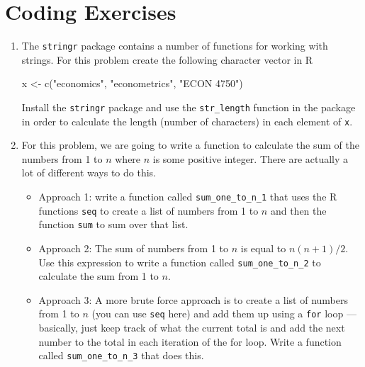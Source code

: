 \documentclass[
  letterpaper,
  DIV=11,
  numbers=noendperiod]{scrreprt}
\newenvironment{Shaded}{\begin{snugshade}}{\end{snugshade}}
\newcommand{\FunctionTok}[1]{\textcolor[rgb]{0.28,0.35,0.67}{#1}}
\newcommand{\NormalTok}[1]{\textcolor[rgb]{0.00,0.23,0.31}{#1}}
\newcommand{\OtherTok}[1]{\textcolor[rgb]{0.00,0.23,0.31}{#1}}
\newcommand{\StringTok}[1]{\textcolor[rgb]{0.13,0.47,0.30}{#1}}
\begin{document}
\section{Coding Exercises}\label{coding-exercises}

\begin{enumerate}
\def\labelenumi{\arabic{enumi}.}
\item
  The \texttt{stringr} package contains a number of functions for
  working with strings. For this problem create the following character
  vector in R

\begin{Shaded}
\begin{Highlighting}[]
\NormalTok{x }\OtherTok{\textless{}{-}} \FunctionTok{c}\NormalTok{(}\StringTok{"economics"}\NormalTok{, }\StringTok{"econometrics"}\NormalTok{, }\StringTok{"ECON 4750"}\NormalTok{)}
\end{Highlighting}
\end{Shaded}

  Install the \texttt{stringr} package and use the \texttt{str\_length}
  function in the package in order to calculate the length (number of
  characters) in each element of \texttt{x}.
\item
  For this problem, we are going to write a function to calculate the
  sum of the numbers from 1 to \(n\) where \(n\) is some positive
  integer. There are actually a lot of different ways to do this.

  \begin{itemize}
  \item
    Approach 1: write a function called \texttt{sum\_one\_to\_n\_1} that
    uses the R functions \texttt{seq} to create a list of numbers from 1
    to \(n\) and then the function \texttt{sum} to sum over that list.
  \item
    Approach 2: The sum of numbers from 1 to \(n\) is equal to
    \(n(n+1)/2\). Use this expression to write a function called
    \texttt{sum\_one\_to\_n\_2} to calculate the sum from 1 to \(n\).\\
  \item
    Approach 3: A more brute force approach is to create a list of
    numbers from 1 to \(n\) (you can use \texttt{seq} here) and add them
    up using a \texttt{for} loop --- basically, just keep track of what
    the current total is and add the next number to the total in each
    iteration of the for loop. Write a function called
    \texttt{sum\_one\_to\_n\_3} that does this.
  \end{itemize}


\end{enumerate}
\end{document}
